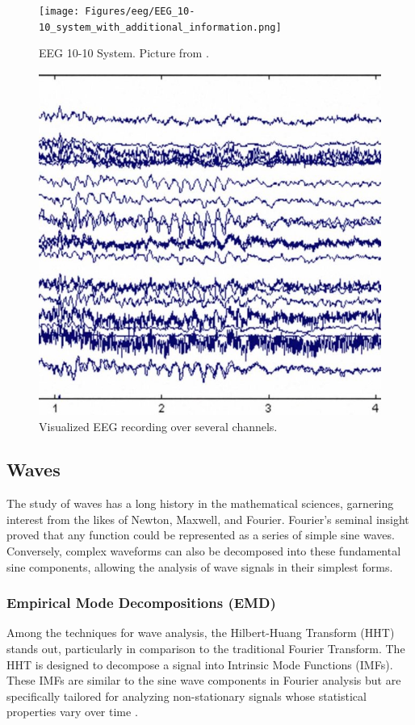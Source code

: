 \begin{figure}
    \centering
    \texttt{[image: Figures/eeg/EEG\_10-10\_system\_with\_additional\_information.png]}
    \caption{EEG 10-10 System. Picture from \cite{Wiki1020EEG}.}
    \label{fig: eeg_1010}
\end{figure}
\begin{figure}
    \centering
    \includegraphics[width=0.6\linewidth]{Figures/eeg/eeg.jpg}
    \caption{Visualized EEG recording over several channels.}
    \label{fig: eeg_viz}
\end{figure}

\subsection{Waves}
The study of waves has a long history in the mathematical sciences, garnering interest from the likes of Newton, Maxwell, and Fourier. Fourier's seminal insight proved that any function could be represented as a series of simple sine waves. Conversely, complex waveforms can also be decomposed into these fundamental sine components, allowing the analysis of wave signals in their simplest forms\cite{bracewell1986fourier}.

\subsubsection{Empirical Mode Decompositions (EMD)}
Among the techniques for wave analysis, the Hilbert-Huang Transform (HHT)\cite{Huang1998EMD} stands out, particularly in comparison to the traditional Fourier Transform. The HHT is designed to decompose a signal into Intrinsic Mode Functions (IMFs). These IMFs are similar to the sine wave components in Fourier analysis but are specifically tailored for analyzing non-stationary signals whose statistical properties vary over time\cite{Huang1998EMD} .

